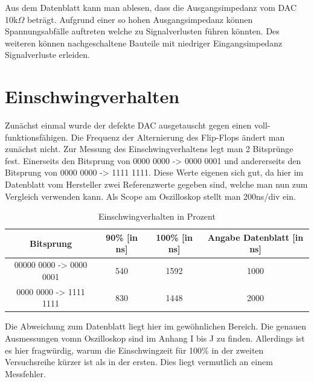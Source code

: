 Aus dem Datenblatt kann man ablesen, dass die Ausgangsimpedanz vom
DAC 10k$\Omega$ beträgt. Aufgrund einer so hohen Ausgangsimpedanz 
können Spannungsabfälle auftreten welche zu Signalverlusten führen 
könnten. Des weiteren können nachgeschaltene Bauteile mit niedriger
Eingangsimpedanz Signalverluste erleiden.




\section{Einschwingverhalten}

Zunächst einmal wurde der defekte DAC ausgetauscht 
gegen einen voll-funktionsfähigen.
Die Frequenz der Alternierung des Flip-Flops ändert man zunächst nicht.
Zur Messung des Einschwingverhaltens legt man 2 Bitsprünge fest.
Einerseits den Bitsprung von 0000 0000 -> 0000 0001 und andererseits 
den Bitsprung von 0000 0000 -> 1111 1111.
Diese Werte eigenen sich gut, da hier im Datenblatt vom Hersteller 
zwei Referenzwerte gegeben sind, welche man nun zum Vergleich verwenden kann.
Als Scope am Oszilloskop stellt man 200ns/div ein. \newline

\begin{table}[h]
	\centering
	\begin{tabular}[h]{c|c|c|c}
		Bitsprung & 90\% [in ns] & 100\% [in ns] & Angabe Datenblatt [in ns] \\
		\hline
		00000 0000 -> 0000 0001 & 540 & 1592 & 1000\\
		\hline
		0000 0000 -> 1111 1111 & 830 & 1448 & 2000\\
	\end{tabular}
	\caption{Einschwingverhalten in Prozent}
	\label{tab:Einschwingverhalten}
\end{table}

Die Abweichung zum Datenblatt liegt hier im gewöhnlichen Bereich.
Die genauen Ausmessungen vomn Oszilloskop sind im Anhang I bis J zu finden.
Allerdings ist es hier fragwürdig, warum die Einschwingzeit für 100\% in der
zweiten Versuchsreihe kürzer ist als in der ersten. Dies liegt vermutlich an
einem Messfehler. \newline 


